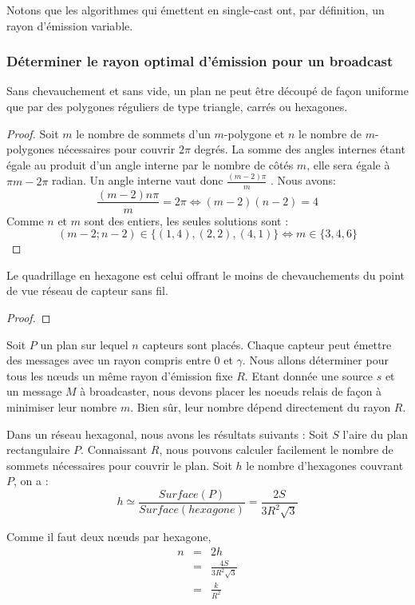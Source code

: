 Notons que les algorithmes qui émettent en single-cast ont, par définition, un rayon d'émission variable.

\subsubsection{Déterminer le rayon optimal d'émission pour un broadcast}
\begin{myth}
Sans chevauchement et sans vide, un plan ne peut être découpé de façon uniforme que par des polygones réguliers de type triangle, carrés ou hexagones.
\end{myth}
\begin{proof}
Soit $m$ le nombre de sommets d'un $m$-polygone et $n$ le nombre de $m$-polygones nécessaires pour couvrir $2\pi$ degrés. La somme des angles internes étant égale au produit d'un 
angle interne par le nombre de côtés $m$, elle sera égale à $\pi m-2 \pi$  radian. Un angle interne vaut donc $\frac{(m-2)\pi }{m}$ . Nous avons: 
$$\frac{(m-2)n\pi}{m}=2\pi \Leftrightarrow (m-2)(n-2)=4$$
Comme $n$ et $m$ sont des entiers, les seules solutions sont : 
$$(m-2;n-2)\in\{(1,4),(2,2),(4,1) \} \Leftrightarrow m \in \{ 3,4,6 \}$$
\end{proof}

\begin{myth}
Le quadrillage en hexagone est celui offrant le moins de chevauchements du point de vue réseau de capteur sans fil. 
\end{myth}
\begin{proof}
\end{proof}



Soit $P$ un plan sur lequel $n$ capteurs sont placés. Chaque capteur peut émettre des messages avec un rayon compris entre 0 et $\gamma$. Nous allons déterminer pour tous les nœuds un même rayon d'émission fixe $R$.
Etant donnée une source $s$ et un message $M$ à broadcaster, nous devons placer les noeuds relais de façon à minimiser leur nombre $m$. Bien sûr, leur nombre dépend directement du rayon $R$.
 

Dans un réseau hexagonal, nous avons les résultats suivants :
Soit $S$ l'aire du plan rectangulaire $P$. Connaissant $R$, nous pouvons calculer facilement le nombre de sommets nécessaires pour couvrir le plan.
Soit $h$ le nombre d'hexagones couvrant $P$, on a : 
$$h \simeq \frac{Surface ( P)}{Surface(hexagone)}=\frac{2S}{3R^2 \sqrt{3}}$$

Comme il faut deux nœuds par hexagone,
\begin{eqnarray*}
n & = & 2h \label{eq:3}\\
 & = & \frac{4S}{3R^2 \sqrt{3}}\\
 & = & \frac{k}{R^2}\label{eq:4}
\end{eqnarray*}

